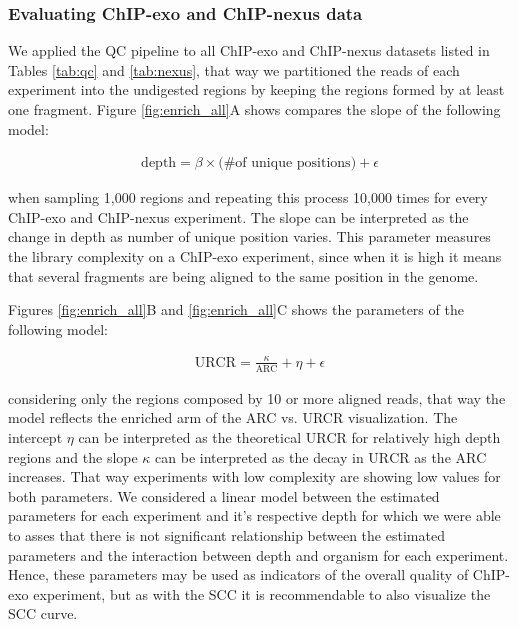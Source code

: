 \documentclass{bmcart}\usepackage[]{graphicx}\usepackage[]{color}
\begin{document}
\subsubsection{Evaluating ChIP-exo and ChIP-nexus data}



We applied the QC pipeline to all ChIP-exo and ChIP-nexus datasets
listed in Tables \ref{tab:qc} and \ref{tab:nexus}, that way we
partitioned the reads of each experiment into the undigested regions
by keeping the regions formed by at least one fragment. Figure
\ref{fig:enrich_all}A shows compares the slope of the following model:

\begin{align}
  \mbox{depth} = \beta \times \text{(\# of unique positions)} +\epsilon  \nonumber
\end{align}

when sampling 1,000 regions and repeating this process
10,000 times for every ChIP-exo and ChIP-nexus experiment. The
slope can be interpreted as the change in depth as number of unique
position varies. This parameter measures the library complexity on a
ChIP-exo experiment, since when it is high it means that several
fragments are being aligned to the same position in the genome. 

Figures \ref{fig:enrich_all}B and \ref{fig:enrich_all}C shows the
parameters of the following model:

\begin{align}
  \mbox{URCR} = \frac{\kappa}{\mbox{ARC}} + \eta + \epsilon \nonumber
\end{align}

considering only the regions composed by 10 or more aligned reads,
that way the model reflects the enriched arm of the ARC vs. URCR
visualization. The intercept $\eta$ can be interpreted as the
theoretical $\mbox{URCR}$ for relatively high depth regions and the
slope $\kappa$ can be interpreted as the decay in $\mbox{URCR}$ as the
$\mbox{ARC}$ increases. That way experiments with low complexity are
showing low values for both parameters. We considered a linear model
between the estimated parameters for each experiment and it's
respective depth for which we were able to asses that there is not
significant relationship between the estimated parameters and the
interaction between depth and organism for each experiment. Hence,
these parameters may be used as indicators of the overall quality of
ChIP-exo experiment, but as with the SCC it is recommendable to also
visualize the SCC curve.
\end{document}
